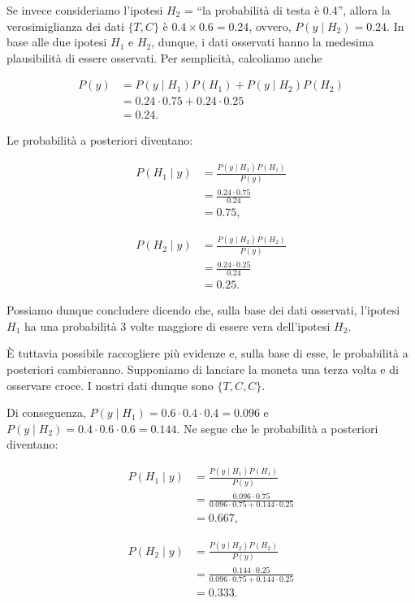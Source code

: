 \documentclass[
  11pt,
]{krantz}
\theoremstyle{definition}
\theoremstyle{definition}
\theoremstyle{definition}
\theoremstyle{definition}
\theoremstyle{remark}
\begin{document}
Se invece consideriamo l'ipotesi \(H_2\) = ``la probabilità di testa è 0.4'', allora la verosimiglianza dei dati \(\{T, C\}\) è \(0.4 \times 0.6 = 0.24\), ovvero, \(P(y \mid H_2) = 0.24\). In base alle due ipotesi \(H_1\) e \(H_2\), dunque, i dati osservati hanno la medesima plausibilità di essere osservati. Per semplicità, calcoliamo anche

\[
\begin{split}
P(y) &= P(y \mid H_1) P(H_1) + P(y \mid H_2) P(H_2) \\
&= 0.24 \cdot 0.75 + 0.24 \cdot 0.25 \\
&= 0.24.
\end{split}
\]

Le probabilità a posteriori diventano:

\[
\begin{split}
P(H_1 \mid y) &= \frac{P(y \mid H_1) P(H_1)}{P(y)}\\
&= \frac{0.24 \cdot 0.75}{0.24} \\
&= 0.75,
\end{split}
\]

\[
\begin{split}
P(H_2 \mid y) &= \frac{P(y \mid H_2) P(H_2)}{P(y)} \\
&= \frac{0.24 \cdot 0.25}{0.24} \\
&= 0.25.
\end{split}
\]

Possiamo dunque concludere dicendo che, sulla base dei dati osservati, l'ipotesi \(H_1\) ha una probabilità 3 volte maggiore di essere vera dell'ipotesi \(H_2\).

È tuttavia possibile raccogliere più evidenze e, sulla base di esse, le probabilità a posteriori cambieranno. Supponiamo di lanciare la moneta una terza volta e di osservare croce. I nostri dati dunque sono \(\{T, C, C\}\).

Di conseguenza, \(P(y \mid H_1) = 0.6 \cdot 0.4 \cdot 0.4 = 0.096\) e \(P(y \mid H_2) = 0.4 \cdot 0.6 \cdot 0.6 = 0.144\). Ne segue che le probabilità a posteriori diventano:

\[
\begin{split}
P(H_1 \mid y) &= \frac{P(y \mid H_1) P(H_1)}{P(y)} \\
&= \frac{0.096 \cdot 0.75}{0.096 \cdot 0.75 + 0.144 \cdot 0.25} \\
&= 0.667,
\end{split}
\]

\[
\begin{split}
P(H_2 \mid y) &= \frac{P(y \mid H_2) P(H_2)}{P(y)} \\
&= \frac{0.144 \cdot 0.25}{0.096 \cdot 0.75 + 0.144 \cdot 0.25} \\
&= 0.333.
\end{split}
\]
\end{document}
